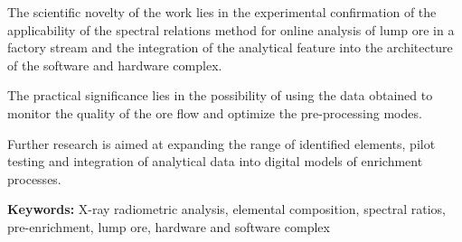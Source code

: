 The scientific novelty of the work lies in the experimental confirmation
of the applicability of the spectral relations method for online
analysis of lump ore in a factory stream and the integration of the
analytical feature into the architecture of the software and hardware
complex.

The practical significance lies in the possibility of using the data
obtained to monitor the quality of the ore flow and optimize the
pre-processing modes.

Further research is aimed at expanding the range of identified elements,
pilot testing and integration of analytical data into digital models of
enrichment processes.

{\bfseries Keywords:} X-ray radiometric analysis, elemental composition,
spectral ratios, pre-enrichment, lump ore, hardware and software complex

